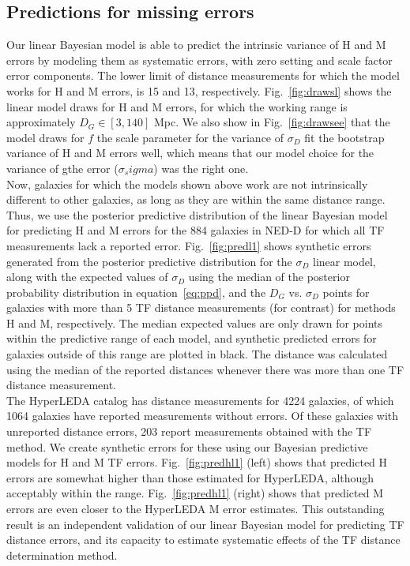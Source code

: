 \documentclass[a4paper,fleqn,usenatbib]{mnras}
\begin{document}
\subsection{Predictions for missing errors}
\label{sec:pred} 
Our linear Bayesian model is able to predict the intrinsic variance of H and M errors by modeling them as systematic errors, with zero setting and scale factor error components. The lower limit of distance measurements for which the model works for H and M errors, is 15 and 13, respectively. Fig.~\ref{fig:drawsl} shows the linear model draws for H and M errors, for which the working range is approximately $D_G\in[3,140]$ Mpc. We also show in Fig.~\ref{fig:drawsee} that the model draws for $f$ the scale parameter for the variance of $\sigma_D$ fit the bootstrap variance of H and M errors well, which means that our model choice for the variance of gthe error ($\sigma_sigma$) was the right one. \\

Now, galaxies for which the models shown above work are not intrinsically different to other galaxies, as long as they are within the same distance range. Thus, we use the posterior predictive distribution of the linear Bayesian model for predicting H and M errors for the 884 galaxies in NED-D for which all TF measurements lack a reported error. Fig.~\ref{fig:predl1} shows synthetic errors generated from the posterior predictive distribution for the $\sigma_D$ linear model, along with the expected values of $\sigma_D$ using the median of the posterior probability distribution in equation~\ref{eq:ppd}, and the $D_G$ vs. $\sigma_D$ points for galaxies with more than 5 TF distance measurements (for contrast) for methods H and M, respectively. The median expected values are only drawn for points within the predictive range of each model, and synthetic predicted errors for galaxies outside of this range are plotted in black. The distance was calculated using the median of the reported distances whenever there was more than one TF distance measurement.\\

The HyperLEDA catalog has distance measurements for 4224 galaxies, of which 1064 galaxies have reported measurements without errors. Of these galaxies with unreported distance errors, 203 report measurements obtained with the TF method. We create synthetic errors for these using our Bayesian predictive models for H and M TF errors. Fig.~\ref{fig:predhl1} (left) shows that predicted H errors are somewhat higher than those estimated for HyperLEDA, although acceptably within the range. Fig.~\ref{fig:predhl1} (right) shows that predicted M errors are even closer to the HyperLEDA M error estimates. This outstanding result is an independent validation of our linear Bayesian model for predicting TF distance errors, and its capacity to estimate systematic effects of the TF distance determination method.\\
\end{document}
